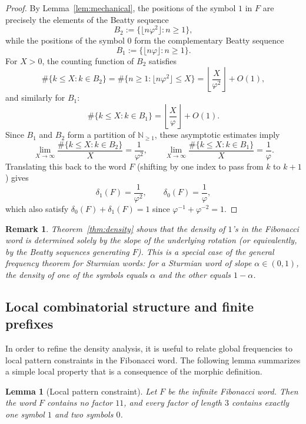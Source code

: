 \documentclass[12pt, a4paper]{article}
\newtheorem{lemma}[theorem]{Lemma}
\newtheorem{remark}{Remark}
\begin{document}
\begin{proof}
By Lemma~\ref{lem:mechanical}, the positions of the symbol $1$ in $F$ are precisely the elements of the Beatty sequence
\[
B_2 := \bigl\{\lfloor n\varphi^2 \rfloor : n \ge 1\bigr\},
\]
while the positions of the symbol $0$ form the complementary Beatty sequence
\[
B_1 := \bigl\{\lfloor n\varphi \rfloor : n \ge 1\bigr\}.
\]
For $X > 0$, the counting function of $B_2$ satisfies
\[
\#\{k \le X : k \in B_2\}
= \#\{n \ge 1 : \lfloor n\varphi^2 \rfloor \le X\}
= \left\lfloor \frac{X}{\varphi^2} \right\rfloor + O(1),
\]
and similarly for $B_1$:
\[
\#\{k \le X : k \in B_1\}
= \left\lfloor \frac{X}{\varphi} \right\rfloor + O(1).
\]
Since $B_1$ and $B_2$ form a partition of $\mathbb{N}_{\ge 1}$, these asymptotic estimates imply
\[
\lim_{X\to\infty} \frac{\#\{k \le X : k \in B_2\}}{X}
= \frac{1}{\varphi^2},
\qquad
\lim_{X\to\infty} \frac{\#\{k \le X : k \in B_1\}}{X}
= \frac{1}{\varphi}.
\]
Translating this back to the word $F$ (shifting by one index to pass from $k$ to $k+1$) gives
\[
\delta_1(F) = \frac{1}{\varphi^2},
\qquad
\delta_0(F) = \frac{1}{\varphi},
\]
which also satisfy $\delta_0(F) + \delta_1(F) = 1$ since $\varphi^{-1} + \varphi^{-2} = 1$.
\end{proof}

\begin{remark}
Theorem~\ref{thm:density} shows that the density of $1$'s in the Fibonacci word is determined solely by the slope of the underlying rotation (or equivalently, by the Beatty sequences generating $F$). This is a special case of the general frequency theorem for Sturmian words: for a Sturmian word of slope $\alpha \in (0,1)$, the density of one of the symbols equals $\alpha$ and the other equals $1-\alpha$.
\end{remark}

\subsection{Local combinatorial structure and finite prefixes}

In order to refine the density analysis, it is useful to relate global frequencies to local pattern constraints in the Fibonacci word. The following lemma summarizes a simple local property that is a consequence of the morphic definition.

\begin{lemma}[Local pattern constraint]\label{lem:local}
Let $F$ be the infinite Fibonacci word. Then the word $F$ contains no factor $11$, and every factor of length $3$ contains exactly one symbol $1$ and two symbols $0$.
\end{lemma}
\end{document}
